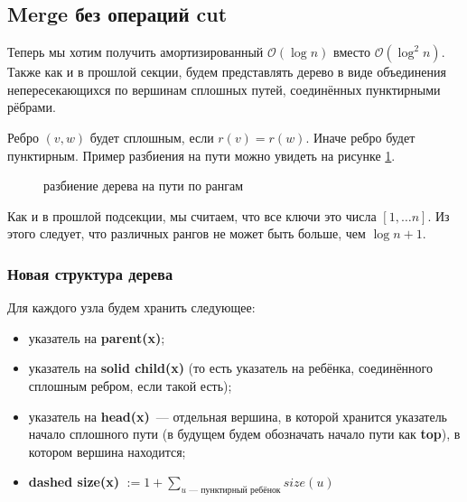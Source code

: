 \subsection{Merge без операций cut}
Теперь мы хотим получить амортизированный $\mathcal{O}(\log{n})$ вместо $\mathcal{O}(\log^2{n}).$ Также как и в прошлой секции, будем представлять дерево в виде объединения непересекающихся по вершинам сплошных путей, соединённых пунктирными рёбрами. 


Ребро $(v, w)$ будет сплошным, если $r(v) = r(w)$. Иначе ребро будет пунктирным. Пример разбиения на пути можно увидеть на рисунке \ref{merge rank}.
\begin{figure}[h]
\caption{разбиение дерева на пути по рангам}
\label{merge rank}
\end{figure}

Как и в прошлой подсекции, мы считаем, что все ключи это числа $[1,\dots n].$ Из этого следует, что различных рангов не может быть больше, чем $\log{n} + 1.$
\subsubsection{Новая структура дерева}
Для каждого узла будем хранить следующее:
\begin{itemize}
    \item указатель на \textbf{parent(x)};
    \item указатель на \textbf{solid child(x)} (то есть указатель на ребёнка, соединённого сплошным ребром, если такой есть);
    \item указатель на \textbf{head(x)}~--- отдельная вершина, в которой хранится указатель начало сплошного пути (в будущем будем обозначать начало пути как \textbf{top}), в котором вершина находится;
    \item \textbf{dashed size(x)} $:= 1 + \sum\limits_{u \text{~--- пунктирный ребёнок}}size(u)$
\end{itemize}


